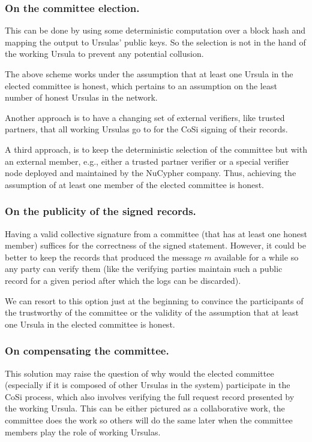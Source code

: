 \subsubsection{On the committee election.} This can be done 
by using some deterministic computation over a block hash and mapping 
the output to Ursulas' public keys. So the selection is not in the hand of the 
working Ursula to prevent any potential collusion. 


The above scheme works under the assumption that at least one Ursula 
in the elected committee is honest, which pertains to an assumption on the 
least number of honest Ursulas in the network.


Another approach is to have a changing set of external verifiers, like 
trusted partners, that all working Ursulas go to for the CoSi signing 
of their records. 


A third approach, is to keep the deterministic selection of the committee 
but with an external member, e.g., either a trusted partner verifier 
or a special verifier node deployed and maintained by the NuCypher company. 
Thus, achieving the assumption of at least one member of the elected 
committee is honest.


\subsubsection{On the publicity of the signed records.} Having a 
valid collective signature from a committee (that has at least one honest 
member) suffices for the correctness of the signed statement. However, 
it could be better to keep the records that produced the message $m$  
available for a while so any party can verify them (like the verifying 
parties maintain such a public record for a given period after which 
the logs can be discarded). 


We can resort to this option just at the beginning to convince the 
participants of the trustworthy of the committee or the validity of the 
assumption that at least one Ursula in the elected committee is honest.


\subsubsection{On compensating the committee.} This solution may 
raise the question of why would the elected committee (especially if it 
is composed of other Ursulas in the system) participate in the CoSi 
process, which also involves verifying the full request record presented 
by the working Ursula. This can be either pictured as a collaborative 
work, the committee does the work so others will do the same later 
when the committee members play the role of working Ursulas.


